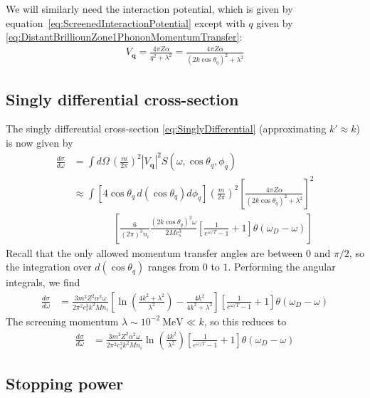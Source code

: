 \documentclass{article}
\newcommand{\MeV}{\text{MeV}}
\begin{document}
We will similarly need the interaction potential, which is given by equation~\eqref{eq:ScreenedInteractionPotential} except with $q$ given by \eqref{eq:DistantBrilliounZone1PhononMomentumTransfer}:
\begin{align}
V_\textbf{q} = \frac{4 \pi Z\alpha}{q^2 + \lambda^2} = \frac{4 \pi Z\alpha}{(2 k \cos\theta_q)^2+ \lambda^2}
\end{align}

\subsection{Singly differential cross-section}

The singly differential cross-section \eqref{eq:SinglyDifferential} (approximating $k' \approx k$) is now given by
\begin{align}
\frac{d \sigma}{d \omega} &= \int d \Omega\, \left( \frac{m}{2 \pi} \right)^2 |V_\textbf{q}|^2 S(\omega, \cos\theta_q, \phi_q) \\
   &\approx \int \left[ 4\cos\theta_q\, d(\cos\theta_q)d \phi_q \right] \left( \frac{m}{2 \pi} \right)^2 \left[ \frac{4 \pi Z\alpha}{(2 k \cos\theta_q)^2+ \lambda^2} \right]^2 \nonumber\\
   &\qquad\qquad \left[ \frac{6}{(2 \pi)^3 n_i} \frac{(2 k\cos\theta_q)^2\omega}{2 M c_s^3} \left[ \frac{1}{e^{\omega/T} - 1} + 1 \right] \theta(\omega_D - \omega) \right]
\end{align}
Recall that the only allowed momentum transfer angles are between 0 and $\pi/2$, so the integration over $d(\cos\theta_q)$ ranges from $0$ to $1$. Performing the angular integrals, we find
\begin{align}
\frac{d \sigma}{d \omega} &= \frac{3 m^2 Z^2 \alpha^2 \omega}{2\pi^2 c_s^3 k^2 M n_i} \left[ \ln \left( \frac{4 k^2 + \lambda^2}{\lambda^2} \right) - \frac{4k^2}{4 k^2 + \lambda^2} \right] \left[ \frac{1}{e^{\omega/T} - 1} + 1 \right] \theta(\omega_D - \omega)
\end{align}
The screening momentum $\lambda \sim 10^{-2}~\MeV \ll k$, so this reduces to
\begin{align}
\frac{d \sigma}{d \omega} &= \frac{3 m^2 Z^2 \alpha^2 \omega}{2\pi^2 c_s^3 k^2 M n_i} \ln \left( \frac{4 k^2}{\lambda^2} \right) \left[ \frac{1}{e^{\omega/T} - 1} + 1 \right] \theta(\omega_D - \omega)
\end{align}

\subsection{Stopping power}
\end{document}
